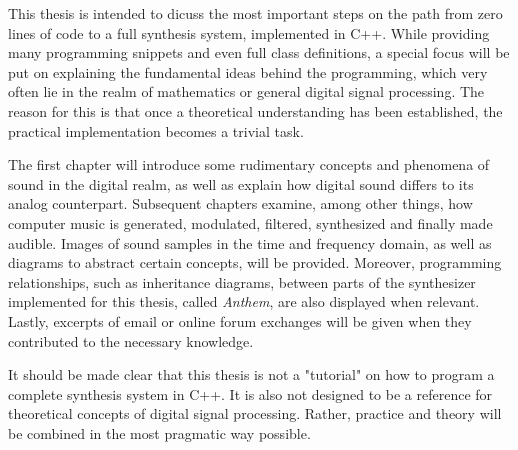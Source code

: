 \noindent This thesis is intended to dicuss the most important steps on the path from zero lines of code to a full synthesis system, implemented in C++. While providing many programming snippets and even full class definitions\footnotemark{}, a special focus will be put on explaining the fundamental ideas behind the programming, which very often lie in the realm of mathematics or general digital signal processing. The reason for this is that once a theoretical understanding has been established, the practical implementation becomes a trivial task.\bigskip


\noindent The first chapter will introduce some rudimentary concepts and phenomena of sound in the digital realm, as well as explain how digital sound differs to its analog counterpart. Subsequent chapters examine, among other things, how computer music is generated, modulated, filtered, synthesized and finally made audible. Images of sound samples in the time and frequency domain, as well as diagrams to abstract certain concepts, will be provided. Moreover, programming relationships, such as inheritance diagrams, between parts of the synthesizer implemented for this thesis, called \emph{Anthem}, are also displayed when relevant. Lastly, excerpts of email or online forum exchanges will be given when they contributed to the necessary knowledge. \bigskip

\noindent It should be made clear that this thesis is not a "tutorial" on how to program a complete synthesis system in C++. It is also not designed to be a reference for theoretical concepts of digital signal processing. Rather, practice and theory will be combined in the most pragmatic way possible.
